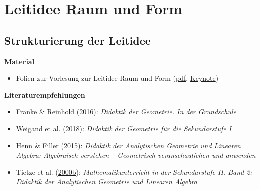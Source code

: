 \documentclass[
]{scrbook}
\providecommand{\tightlist}{%
  \setlength{\itemsep}{0pt}\setlength{\parskip}{0pt}}
\renewenvironment{quote}{
  \list{}{
	\leftmargin0.2cm   %
    \rightmargin\leftmargin
      	\def\FrameCommand
    {%
        {\color{quoteColor}\vrule width 2pt}%
        \hspace{0pt}%
    }%
    \MakeFramed{\advance \hsize -\width \FrameRestore}    \color{quoteColor}
    }
  \item\relax
}
{\endlist\color{black}\endMakeFramed}
\theoremstyle{definition}
\theoremstyle{definition}
\theoremstyle{definition}
\theoremstyle{definition}
\theoremstyle{remark}
\begin{document}
\hypertarget{leitidee-raum-und-form}{%
\chapter{Leitidee Raum und Form}\label{leitidee-raum-und-form}}

\hypertarget{strukturierung-der-leitidee-raum-und-form}{%
\section{Strukturierung der Leitidee}\label{strukturierung-der-leitidee-raum-und-form}}

\begin{quote}
\textbf{Material}

\begin{itemize}
\tightlist
\item
  Folien zur Vorlesung zur Leitidee Raum und Form (\href{files/Stoffdidaktik-WiSe2223-Kap12.pdf}{pdf}, \href{files/Stoffdidaktik-WiSe2223-Kap12.key}{Keynote})
\end{itemize}

\textbf{Literaturempfehlungen}

\begin{itemize}
\tightlist
\item
  Franke \& Reinhold (\protect\hyperlink{ref-Franke2016}{2016}): \emph{Didaktik der Geometrie. In der Grundschule}
\item
  Weigand et al. (\protect\hyperlink{ref-Weigand2018}{2018}): \emph{Didaktik der Geometrie für die Sekundarstufe I}
\item
  Henn \& Filler (\protect\hyperlink{ref-Henn2015}{2015}): \emph{Didaktik der Analytischen Geometrie und Linearen Algebra: Algebraisch verstehen -- Geometrisch veranschaulichen und anwenden}
\item
  Tietze et al. (\protect\hyperlink{ref-Tietze:2000}{2000b}): \emph{Mathematikunterricht in der Sekundarstufe II. Band 2: Didaktik der Analytischen Geometrie und Linearen Algebra}
\end{itemize}
\end{quote}
\end{document}
